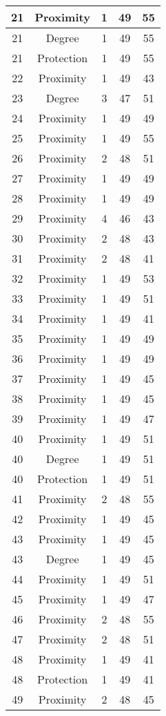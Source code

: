 \documentclass[results.tex]{subfiles}
\begin{document}
\begin{center}
\begin{tabular}{| c || c | c | c | c |}
    \hline
    21 & Proximity & 1 & 49 & 55 \\ 
    \hline
    21 & Degree & 1 & 49 & 55 \\ 
    \hline
    21 & Protection & 1 & 49 & 55 \\ 
    \hline
    22 & Proximity & 1 & 49 & 43 \\ 
    \hline
    23 & Degree & 3 & 47 & 51 \\ 
    \hline
    24 & Proximity & 1 & 49 & 49 \\ 
    \hline
    25 & Proximity & 1 & 49 & 55 \\ 
    \hline
    26 & Proximity & 2 & 48 & 51 \\ 
    \hline
    27 & Proximity & 1 & 49 & 49 \\ 
    \hline
    28 & Proximity & 1 & 49 & 49 \\ 
    \hline
    29 & Proximity & 4 & 46 & 43 \\ 
    \hline
    30 & Proximity & 2 & 48 & 43 \\ 
    \hline
    31 & Proximity & 2 & 48 & 41 \\ 
    \hline
    32 & Proximity & 1 & 49 & 53 \\ 
    \hline
    33 & Proximity & 1 & 49 & 51 \\ 
    \hline
    34 & Proximity & 1 & 49 & 41 \\ 
    \hline
    35 & Proximity & 1 & 49 & 49 \\ 
    \hline
    36 & Proximity & 1 & 49 & 49 \\ 
    \hline
    37 & Proximity & 1 & 49 & 45 \\ 
    \hline
    38 & Proximity & 1 & 49 & 45 \\ 
    \hline
    39 & Proximity & 1 & 49 & 47 \\ 
    \hline
    40 & Proximity & 1 & 49 & 51 \\ 
    \hline
    40 & Degree & 1 & 49 & 51 \\ 
    \hline
    40 & Protection & 1 & 49 & 51 \\ 
    \hline
    41 & Proximity & 2 & 48 & 55 \\ 
    \hline
    42 & Proximity & 1 & 49 & 45 \\ 
    \hline
    43 & Proximity & 1 & 49 & 45 \\ 
    \hline
    43 & Degree & 1 & 49 & 45 \\ 
    \hline
    44 & Proximity & 1 & 49 & 51 \\ 
    \hline
    45 & Proximity & 1 & 49 & 47 \\ 
    \hline
    46 & Proximity & 2 & 48 & 55 \\ 
    \hline
    47 & Proximity & 2 & 48 & 51 \\ 
    \hline
    48 & Proximity & 1 & 49 & 41 \\ 
    \hline
    48 & Protection & 1 & 49 & 41 \\ 
    \hline
    49 & Proximity & 2 & 48 & 45 \\ 
    \hline   \end{tabular}
\end{center}
\end{document}
